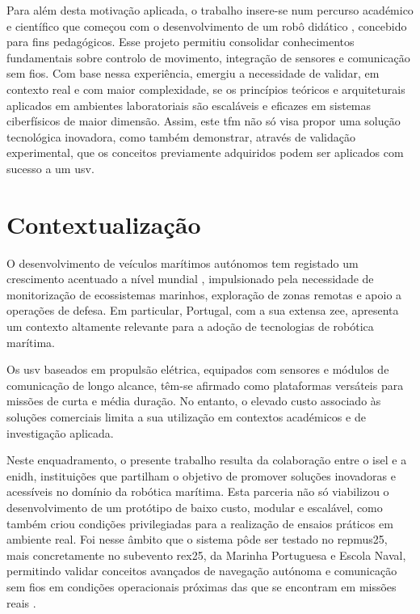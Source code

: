 Para além desta motivação aplicada, o trabalho insere-se num percurso académico e científico que começou com o desenvolvimento de um robô didático \cite{didactic-robot-thesis}, concebido para fins pedagógicos. Esse projeto permitiu consolidar conhecimentos fundamentais sobre controlo de movimento, integração de sensores e comunicação sem fios. Com base nessa experiência, emergiu a necessidade de validar, em contexto real e com maior complexidade, se os princípios teóricos e arquiteturais aplicados em ambientes laboratoriais são escaláveis e eficazes em sistemas ciberfísicos de maior dimensão. Assim, este \gls{tfm} não só visa propor uma solução tecnológica inovadora, como também demonstrar, através de validação experimental, que os conceitos previamente adquiridos podem ser aplicados com sucesso a um \gls{usv}.  

\section{Contextualização}
\label{sec:contextualizacao}

O desenvolvimento de veículos marítimos autónomos tem registado um crescimento acentuado a nível mundial \cite{gminsights-autonomous-marine-vehicle}, impulsionado pela necessidade de monitorização de ecossistemas marinhos, exploração de zonas remotas e apoio a operações de defesa. Em particular, Portugal, com a sua extensa \gls{zee}, apresenta um contexto altamente relevante para a adoção de tecnologias de robótica marítima.  

Os \gls{usv} baseados em propulsão elétrica, equipados com sensores e módulos de comunicação de longo alcance, têm-se afirmado como plataformas versáteis para missões de curta e média duração. No entanto, o elevado custo associado às soluções comerciais limita a sua utilização em contextos académicos e de investigação aplicada.  

Neste enquadramento, o presente trabalho resulta da colaboração entre o \gls{isel} e a \gls{enidh}, instituições que partilham o objetivo de promover soluções inovadoras e acessíveis no domínio da robótica marítima. Esta parceria não só viabilizou o desenvolvimento de um protótipo de baixo custo, modular e escalável, como também criou condições privilegiadas para a realização de ensaios práticos em ambiente real. Foi nesse âmbito que o sistema pôde ser testado no \gls{repmus25}, mais concretamente no subevento \gls{rex25}, da Marinha Portuguesa e Escola Naval, permitindo validar conceitos avançados de navegação autónoma e comunicação sem fios em condições operacionais próximas das que se encontram em missões reais \cite{isel-repmus, enidh-repmus, sapo-repmus}.

